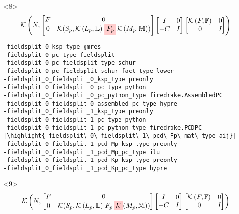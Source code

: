 \documentclass[presentation]{beamer}
\newcommand{\KSP}[2]{\ensuremath{\mathcal{K}\left(#1, \mathbb{#2}\right)}}
\newcommand{\ksp}[1]{\KSP{#1}{#1}}
\newcommand{\highlight}[1]{\colorbox{red!20}{\color{black} #1}}
\begin{document}
\begin{frame}[fragile]
  \begin{onlyenv}<8>
    \color{gray}
    \begin{equation*}
      \KSP{N}{%
        \begin{bmatrix}
        F & 0 \\
        0 & \mathcal{K}(S_p, \KSP{L_p}{L}\,\highlight{$F_p$} \, \KSP{M_p}{M})
      \end{bmatrix}
      \begin{bmatrix}
        I & 0\\
        -C & I
      \end{bmatrix}
      \begin{bmatrix}
        \ksp{F} & 0 \\
        0 & I
      \end{bmatrix}}
    \end{equation*}
\begin{verbatim}
-fieldsplit_0_ksp_type gmres
-fieldsplit_0_pc_type fieldsplit
-fieldsplit_0_pc_fieldsplit_type schur
-fieldsplit_0_pc_fieldsplit_schur_fact_type lower
-fieldsplit_0_fieldsplit_0_ksp_type preonly
-fieldsplit_0_fieldsplit_0_pc_type python
-fieldsplit_0_fieldsplit_0_pc_python_type firedrake.AssembledPC
-fieldsplit_0_fieldsplit_0_assembled_pc_type hypre
-fieldsplit_0_fieldsplit_1_ksp_type preonly
-fieldsplit_0_fieldsplit_1_pc_type python
-fieldsplit_0_fieldsplit_1_pc_python_type firedrake.PCDPC
|\highlight{-fieldsplit\_0\_fieldsplit\_1\_pcd\_Fp\_mat\_type aij}|
-fieldsplit_0_fieldsplit_1_pcd_Mp_ksp_type preonly
-fieldsplit_0_fieldsplit_1_pcd_Mp_pc_type ilu
-fieldsplit_0_fieldsplit_1_pcd_Kp_ksp_type preonly
-fieldsplit_0_fieldsplit_1_pcd_Kp_pc_type hypre
\end{verbatim}
  \end{onlyenv}
  \begin{onlyenv}<9>
    \color{gray}
    \begin{equation*}
      \KSP{N}{%
      \begin{bmatrix}
        F & 0 \\
        0 & \mathcal{K}(S_p, \KSP{L_p}{L}\,F_p \, \highlight{$\mathcal{K}$}(M_p, \mathbb{M}))
      \end{bmatrix}
      \begin{bmatrix}
        I & 0\\
        -C & I
      \end{bmatrix}
      \begin{bmatrix}
        \ksp{F} & 0 \\
        0 & I
      \end{bmatrix}}

\end{equation*}
\end{onlyenv}
\end{frame}
\end{document}
